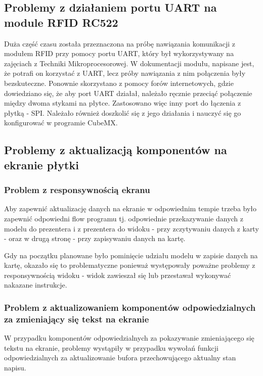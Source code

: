 \documentclass[12pt,hidelinks]{article}
\begin{document}
    \subsection{Problemy z działaniem portu UART na module RFID RC522}
    Duża część czasu została przeznaczona na próbę nawiązania komunikacji z modułem RFID przy pomocy portu UART, który był wykorzystywany na zajęciach z Techniki Mikroprocesorowej. W dokumentacji modułu, napisane jest, że potrafi on korzystać z UART, lecz próby nawiązania z nim połączenia były bezskuteczne. Ponownie skorzystano z pomocy forów internetowych, gdzie dowiedziano się, że aby port UART działał, należało ręcznie przeciąć połączenie między dwoma stykami na płytce. 
    Zastosowano więc inny port do łączenia z płytką - SPI. Należało również doszkolić się z jego działania i nauczyć się go konfigurować w programie CubeMX.
    

    \subsection{Problemy z aktualizacją komponentów na ekranie płytki}

    \subsubsection{Problem z responsywnością ekranu}

    Aby zapewnić aktualizację danych na ekranie w odpowiednim tempie trzeba było zapewnić odpowiedni flow programu tj. odpowiednie przekazywanie danych z modelu do prezentera i z prezentera do widoku - przy zczytywaniu danych z karty - oraz w drugą stronę - przy zapisywaniu danych na kartę.

    \vskip 0.2in

    Gdy na początku planowane było pominięcie udziału modelu w zapisie danych na kartę, okazało się to problematyczne ponieważ występowały poważne problemy z responsywnością widoku - widok zawieszał się lub przestawał wykonywać nakazane instrukcje.

    \subsubsection{Problem z aktualizowaniem komponentów odpowiedzialnych za zmieniający się tekst na ekranie}

    W przypadku komponentów odpowiedzialnych za pokazywanie zmieniającego się tekstu na ekranie, problemy wystąpiły w przypadku wywołań funkcji odpowiedzialnych za aktualizowanie bufora przechowującego aktualny stan napisu.
\end{document}
